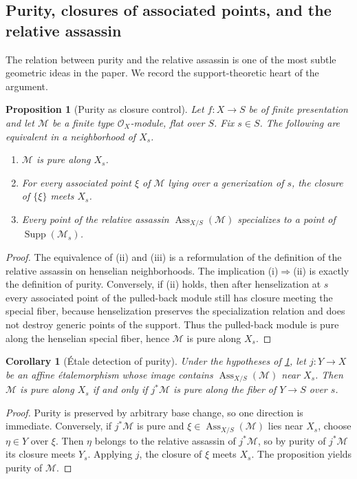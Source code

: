 \documentclass[11pt,oneside]{article}
\newtheorem{proposition}[theorem]{Proposition}
\newtheorem{corollary}[theorem]{Corollary}
\newcommand{\M}{\mathcal M}
\newcommand{\OO}{\mathcal O}
\newcommand{\Supp}{\operatorname{Supp}}
\newcommand{\Ass}{\operatorname{Ass}}
\newcommand{\etale}{\'etale}
\begin{document}
\subsection{Purity, closures of associated points, and the relative assassin}

The relation between purity and the relative assassin is one of the most subtle geometric ideas in the paper.  We record the support-theoretic heart of the argument.

\begin{proposition}[Purity as closure control]\label{prop:purity-support}
Let $f\colon X\to S$ be of finite presentation and let $\M$ be a finite type $\OO_X$-module, flat over $S$.  Fix $s\in S$.  The following are equivalent in a neighborhood of $X_s$.
\begin{enumerate}[label=\textup{(\roman*)}]
  \item $\M$ is pure along $X_s$.
  \item For every associated point $\xi$ of $\M$ lying over a generization of $s$, the closure of $\{\xi\}$ meets $X_s$.
  \item Every point of the relative assassin $\Ass_{X/S}(\M)$ specializes to a point of $\Supp(\M_s)$.
\end{enumerate}
\end{proposition}

\begin{proof}
The equivalence of (ii) and (iii) is a reformulation of the definition of the relative assassin on henselian neighborhoods.  The implication (i)$\Rightarrow$(ii) is exactly the definition of purity.  Conversely, if (ii) holds, then after henselization at $s$ every associated point of the pulled-back module still has closure meeting the special fiber, because henselization preserves the specialization relation and does not destroy generic points of the support.  Thus the pulled-back module is pure along the henselian special fiber, hence $\M$ is pure along $X_s$.
\end{proof}

\begin{corollary}[\'Etale detection of purity]\label{cor:purity-etale-detect}
Under the hypotheses of \cref{prop:purity-support}, let $j\colon Y\to X$ be an affine \etale morphism whose image contains $\Ass_{X/S}(\M)$ near $X_s$.  Then $\M$ is pure along $X_s$ if and only if $j^*\M$ is pure along the fiber of $Y\to S$ over $s$.
\end{corollary}

\begin{proof}
Purity is preserved by arbitrary base change, so one direction is immediate.  Conversely, if $j^*\M$ is pure and $\xi\in\Ass_{X/S}(\M)$ lies near $X_s$, choose $\eta\in Y$ over $\xi$.  Then $\eta$ belongs to the relative assassin of $j^*\M$, so by purity of $j^*\M$ its closure meets $Y_s$.  Applying $j$, the closure of $\xi$ meets $X_s$.  The proposition yields purity of $\M$.
\end{proof}
\end{document}
